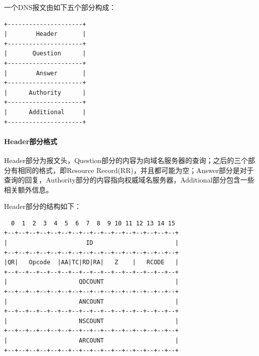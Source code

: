 \documentclass[lang=cn,11pt,a4paper,cite=authornum]{paper}
\begin{document}
一个DNS报文由如下五个部分构成：

\begin{code}
\begin{verbatim}
+---------------------+
|        Header       |
+---------------------+
|       Question      |
+---------------------+
|        Answer       |
+---------------------+
|      Authority      |
+---------------------+
|      Additional     |
+---------------------+
\end{verbatim}
\end{code}

\paragraph{Header部分格式}

Header部分为报文头，Question部分的内容为向域名服务器的查询；之后的三个部分有相同的格式，即Resource Record(RR)，并且都可能为空；Answer部分是对于查询的回复，Authority部分的内容指向权威域名服务器，Additional部分包含一些相关额外信息。

Header部分的结构如下：

\begin{code}
\begin{verbatim}
  0  1  2  3  4  5  6  7  8  9 10 11 12 13 14 15
+--+--+--+--+--+--+--+--+--+--+--+--+--+--+--+--+
|                      ID                       |
+--+--+--+--+--+--+--+--+--+--+--+--+--+--+--+--+
|QR|   Opcode  |AA|TC|RD|RA|   Z    |   RCODE   |
+--+--+--+--+--+--+--+--+--+--+--+--+--+--+--+--+
|                    QDCOUNT                    |
+--+--+--+--+--+--+--+--+--+--+--+--+--+--+--+--+
|                    ANCOUNT                    |
+--+--+--+--+--+--+--+--+--+--+--+--+--+--+--+--+
|                    NSCOUNT                    |
+--+--+--+--+--+--+--+--+--+--+--+--+--+--+--+--+
|                    ARCOUNT                    |
+--+--+--+--+--+--+--+--+--+--+--+--+--+--+--+--+
\end{verbatim}
\end{code}
\end{document}
